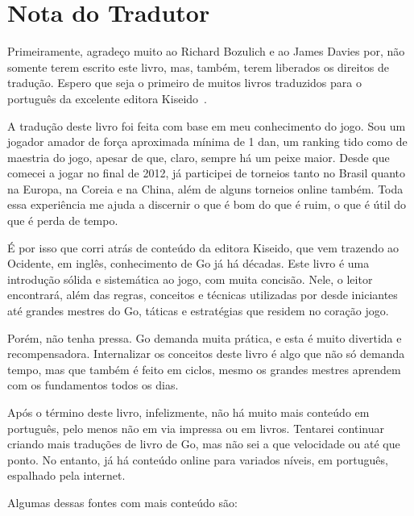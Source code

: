 \chapter{Nota do Tradutor}


Primeiramente, agradeço muito ao Richard Bozulich e ao James Davies por, não somente terem escrito este livro, mas, também, terem liberados os direitos de tradução. Espero que seja o primeiro de muitos livros traduzidos para o português da excelente editora Kiseido~\cite{kiseido}.

\bigskip

A tradução deste livro foi feita com base em meu conhecimento do jogo. Sou um jogador amador de força aproximada mínima de 1 dan, um ranking tido como de maestria do jogo, apesar de que, claro, sempre há um peixe maior. Desde que comecei a jogar no final de 2012, já participei de torneios tanto no Brasil quanto na Europa, na Coreia e na China, além de alguns torneios online também. Toda essa experiência me ajuda a discernir o que é bom do que é ruim, o que é útil do que é perda de tempo.

É por isso que corri atrás de conteúdo da editora Kiseido, que vem trazendo ao Ocidente, em inglês, conhecimento de Go já há décadas. Este livro é uma introdução sólida e sistemática ao jogo, com muita concisão. Nele, o leitor encontrará, além das regras, conceitos e técnicas utilizadas por desde iniciantes até grandes mestres do Go, táticas e estratégias que residem no coração jogo.

Porém, não tenha pressa. Go demanda muita prática, e esta é muito divertida e recompensadora. Internalizar os conceitos deste livro é algo que não só demanda tempo, mas que também é feito em ciclos, mesmo os grandes mestres aprendem com os fundamentos todos os dias.

\pagebreak

Após o término deste livro, infelizmente, não há muito mais conteúdo em português, pelo menos não em via impressa ou em livros. Tentarei continuar criando mais traduções de livro de Go, mas não sei a que velocidade ou até que ponto. No entanto, já há conteúdo online para variados níveis, em português, espalhado pela internet.

Algumas dessas fontes com mais conteúdo são:

